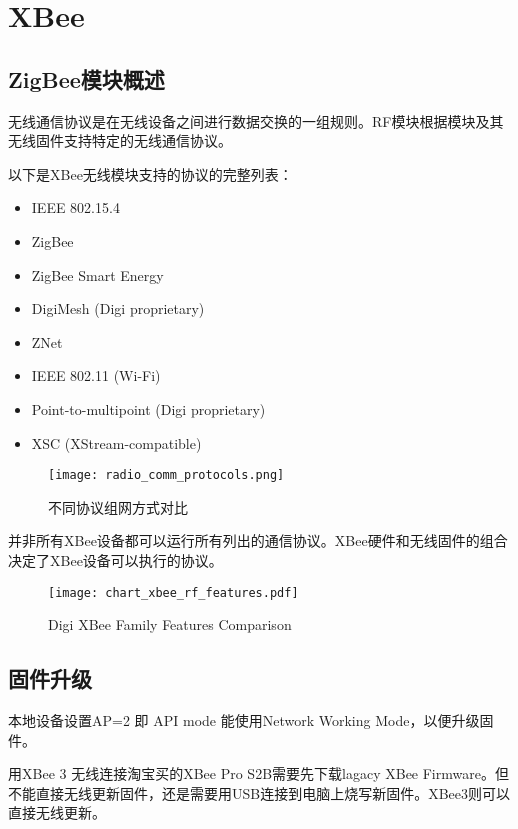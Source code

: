 \chapter{XBee}
\label{cha:XBee}

\section{ZigBee模块概述}

无线通信协议是在无线设备之间进行数据交换的一组规则。RF模块根据模块及其无线固件支持特定的无线通信协议。

以下是XBee无线模块支持的协议的完整列表：

\begin{itemize}
    \item IEEE 802.15.4
    \item ZigBee
    \item ZigBee Smart Energy
    \item DigiMesh (Digi proprietary)
    \item ZNet
    \item IEEE 802.11 (Wi-Fi)
    \item Point-to-multipoint (Digi proprietary)
    \item XSC (XStream-compatible)
\end{itemize}

\begin{figure}[htbp]
    \centering
    \texttt{[image: radio\_comm\_protocols.png]}
    \caption{不同协议组网方式对比}
    \label{fig:radio_comm_protocols}
\end{figure}

并非所有XBee设备都可以运行所有列出的通信协议。XBee硬件和无线固件的组合决定了XBee设备可以执行的协议。

\begin{figure}[htbp]
    \centering
    \texttt{[image: chart\_xbee\_rf\_features.pdf]}
    \caption{Digi XBee Family Features Comparison}
    \label{fig:xbee_rf_features}
\end{figure}

\section{固件升级}

本地设备设置AP=2 即 API mode 能使用Network Working Mode，以便升级固件。

用XBee 3 无线连接淘宝买的XBee Pro S2B需要先下载lagacy XBee Firmware。但不能直接无线更新固件，还是需要用USB连接到电脑上烧写新固件。XBee3则可以直接无线更新。

